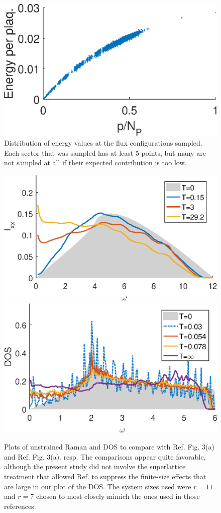 \documentclass[reprint,amsmath,amssymb,aps,prl,groupedaddress,nofootinbib,superscriptaddress]{revtex4-1}
\newcommand{\1}{\mathds{1}}
\begin{document}



\begin{figure}
	\centering
	\includegraphics[width=0.4\linewidth]{stretch_En_rmax_15_b_10_s_40.eps} 
	\caption{Distribution of energy values at the flux configurations sampled. Each sector that was sampled has at least 5 points, but many are not sampled at all if their expected contribution is too low.} 
	\label{EndistPlot}
\end{figure}

\begin{figure}
	\centering
	\includegraphics[width=0.43\linewidth]{stretch_Ixx_special_b_rmax_11_b_10_s_0.eps} 
	\includegraphics[width=0.43\linewidth]{stretch_DOS_special_b_rmax_7_b_10_s_0.eps} 
	\caption{Plots of unstrained Raman and DOS to compare with Ref. \cite{Nasu16} Fig. 3(a) and Ref. \cite{Nasu15} Fig. 3(a). resp. The comparisons appear quite favorable, although the present study did not involve the superlattice treatment that allowed Ref. \cite{Nasu15} to suppress the finite-size effects that are large in our plot of the DOS. The system sizes used were $ r = 11$ and $r=7$ chosen to most closely mimich the ones used in those references. }
	\label{comparePlots}
\end{figure}


	
\end{document}
